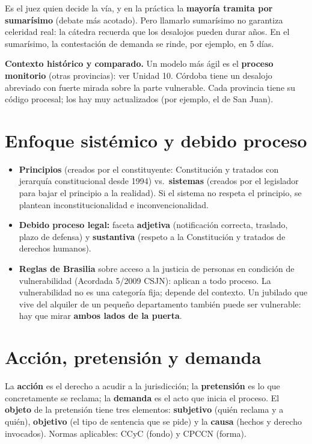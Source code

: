 Es el juez quien decide la vía, y en la práctica la \textbf{mayoría tramita por sumarísimo} (debate más acotado). Pero llamarlo sumarísimo no garantiza celeridad real: la cátedra recuerda que los desalojos pueden durar años. En el sumarísimo, la contestación de demanda se rinde, por ejemplo, en 5 días.

\begin{note}
\textbf{Contexto histórico y comparado.} Un modelo más ágil es el \textbf{proceso monitorio} (otras provincias): ver Unidad 10. Córdoba tiene un desalojo abreviado con fuerte mirada sobre la parte vulnerable. Cada provincia tiene su código procesal; los hay muy actualizados (por ejemplo, el de San Juan).
\end{note}

\section{Enfoque sistémico y debido proceso}

\begin{itemize}
  \item \textbf{Principios} (creados por el constituyente: Constitución y tratados con jerarquía constitucional desde 1994) vs.\ \textbf{sistemas} (creados por el legislador para bajar el principio a la realidad). Si el sistema no respeta el principio, se plantean inconstitucionalidad e inconvencionalidad.
  \item \textbf{Debido proceso legal:} faceta \textbf{adjetiva} (notificación correcta, traslado, plazo de defensa) y \textbf{sustantiva} (respeto a la Constitución y tratados de derechos humanos).
  \item \textbf{Reglas de Brasilia} sobre acceso a la justicia de personas en condición de vulnerabilidad (Acordada 5/2009 CSJN): aplican a todo proceso. La vulnerabilidad no es una categoría fija; depende del contexto. Un jubilado que vive del alquiler de un pequeño departamento también puede ser vulnerable: hay que mirar \textbf{ambos lados de la puerta}.
\end{itemize}

\section{Acción, pretensión y demanda}

La \textbf{acción} es el derecho a acudir a la jurisdicción; la \textbf{pretensión} es lo que concretamente se reclama; la \textbf{demanda} es el acto que inicia el proceso. El \textbf{objeto} de la pretensión tiene tres elementos: \textbf{subjetivo} (quién reclama y a quién), \textbf{objetivo} (el tipo de sentencia que se pide) y la \textbf{causa} (hechos y derecho invocados). Normas aplicables: CCyC (fondo) y CPCCN (forma).

